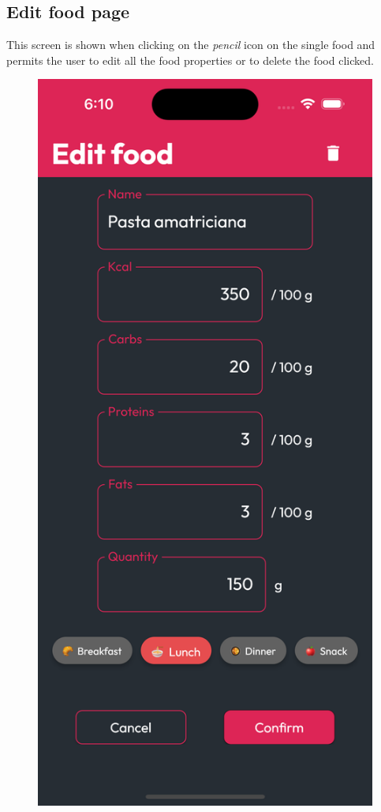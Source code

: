 \documentclass{Configuration_Files/PoliMi3i_thesis}
\begin{document}
\clearpage

\subsection{Edit food page}

\begin{minipage}{\linewidth}
    This screen is shown when clicking on the \emph{pencil} icon on the single food and permits the user to edit all the food properties or to delete the food clicked.
\end{minipage}

\begin{figure}[!h]
  \centering
  \includegraphics[scale=0.1]{Images/Screenshots/Mobile/EditFood.png}

\end{figure}
\end{document}
